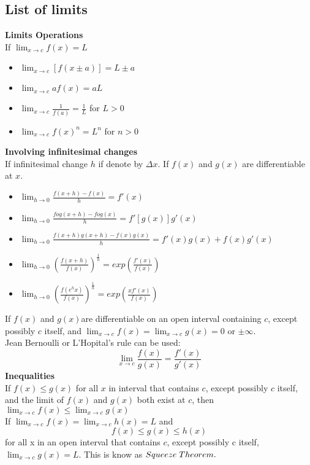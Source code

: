 \documentclass[12pt]{article}
\begin{document}
\subsection{List of limits}
\textbf{Limits Operations} \\
If $\lim_{x \to c} f(x)=L$
\begin{itemize}
\item $\lim_{x \to c} [f(x \pm a)]=L \pm a$
\item $\lim_{x \to c} af(x)=aL$
\item $\lim_{x \to c} \frac{1}{f(a)}= \frac{1}{L}$ for $L>0$
\item $\lim_{x \to c} f(x)^n=L^n$ for $n>0$
\end{itemize}
\textbf{Involving infinitesimal changes} \\
If infinitesimal change $h$ if denote by $\Delta x$. If $f(x)$ and $g(x)$ are differentiable at $x$.
\begin{itemize}
\item $\lim_{h \to 0} \frac{f(x+h)-f(x)}{h}=f'(x)$
\item $\lim_{h \to 0} \frac{fog(x+h)-fog(x)}{h}=f'[g(x)]g'(x)$
\item $\lim_{h \to 0} \frac{f(x+h)g(x+h)-f(x)g(x)}{h}=f'(x)g(x)+f(x)g'(x)$
\item $\lim_{h \to 0}( \frac{f(x+h)}{f(x)} )^{\frac{1}{h}}=exp(\frac{f'(x)}{f(x)})$
\item $\lim_{h \to 0}( \frac{f(e^h x)}{f(x)} )^{\frac{1}{h}}=exp(\frac{xf'(x)}{f(x)})$
\end{itemize}
If $f(x)$ and $g(x) $are differentiable on an open interval containing $c$, except possibly $c$ itself, and $\lim_{x \to c} f(x)=\lim_{x \to c} g(x)=0$ or $\pm \infty$. \\ 
Jean Bernoulli or L'Hopital's rule can be used: $$\lim_{x \to c} \frac{f(x)}{g(x)}= \frac{f'(x)}{g'(x)}$$
\textbf{Inequalities} \\
If $f(x) \le g(x)$ for all $x$ in interval that contains $c$, except possibly $c$ itself, and the limit of $f(x)$ and $g(x)$ both exist at $c$, then $\lim_{x \to c} f(x) \le \lim_{x \to c} g(x) $ \\
If $\lim_{x \to c} f(x)= \lim_{x \to c} h(x)=L $ and $$f(x) \le g(x) \le h(x)$$ for all x in an open interval that contains $c$, except 
possibly c itself, $\lim_{x \to c} g(x)=L$. This is know as $Squeeze \thickspace Theorem.$
\end{document}
